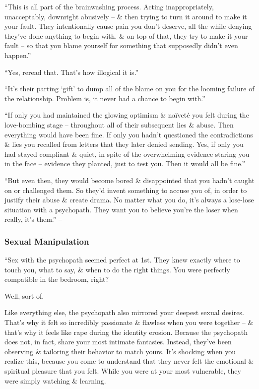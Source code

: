 \documentclass{article}
\numberwithin{equation}{section}
\begin{document}
``This is all part of the brainwashing process. Acting inappropriately, unacceptably, downright abusively -- \& then trying to turn it around to make it your fault. They intentionally cause pain you don't deserve, all the while denying they've done anything to begin with. \& on top of that, they try to make it your fault -- so that you blame yourself for something that supposedly didn't even happen.''

``Yes, reread that. That's how illogical it is.''

``It's their parting `gift' to dump all of the blame on you for the looming failure of the relationship. Problem is, it never had a chance to begin with.''

``If only you had maintained the glowing optimism \& na\"{i}vet\'e you felt during the love-bombing stage -- throughout all of their subsequent lies \& abuse. Then everything would have been fine. If only you hadn't questioned the contradictions \& lies you recalled from letters that they later denied sending. Yes, if only you had stayed compliant \& quiet, in spite of the overwhelming evidence staring you in the face -- evidence they planted, just to test you. Then it would all be fine.''

``But even then, they would become bored \& disappointed that you hadn't caught on or challenged them. So they'd invent something to accuse you of, in order to justify their abuse \& create drama. No matter what you do, it's always a lose-lose situation with a psychopath. They want you to believe you're the loser when really, it's them.'' -- \cite[p. 48]{MacKenzie2015}

\subsubsection{Sexual Manipulation}
``Sex with the psychopath seemed perfect at 1st. They knew exactly where to touch you, what to say, \& when to do the right things. You were perfectly compatible in the bedroom, right?

Well, sort of.

Like everything else, the psychopath also mirrored your deepest sexual desires. That's why it felt so incredibly passionate \& flawless when you were together -- \& that's why it feels like rape during the identity erosion. Because the psychopath does not, in fact, share your most intimate fantasies. Instead, they've been observing \& tailoring their behavior to match yours. It's shocking when you realize this, because you come to understand that they never felt the emotional \& spiritual pleasure that you felt. While you were at your most vulnerable, they were simply watching \& learning.
\end{document}
